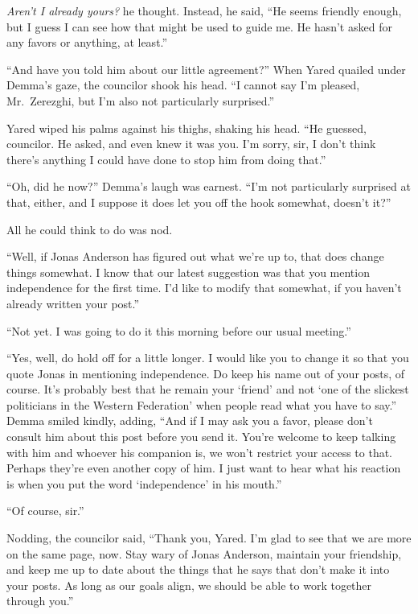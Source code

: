 \emph{Aren't I already yours?} he thought. Instead, he said, ``He seems friendly enough, but I guess I can see how that might be used to guide me. He hasn't asked for any favors or anything, at least.''

``And have you told him about our little agreement?'' When Yared quailed under Demma's gaze, the councilor shook his head. ``I cannot say I'm pleased, Mr.~Zerezghi, but I'm also not particularly surprised.''

Yared wiped his palms against his thighs, shaking his head. ``He guessed, councilor. He asked, and even knew it was you. I'm sorry, sir, I don't think there's anything I could have done to stop him from doing that.''

``Oh, did he now?'' Demma's laugh was earnest. ``I'm not particularly surprised at that, either, and I suppose it does let you off the hook somewhat, doesn't it?''

All he could think to do was nod.

``Well, if Jonas Anderson has figured out what we're up to, that does change things somewhat. I know that our latest suggestion was that you mention independence for the first time. I'd like to modify that somewhat, if you haven't already written your post.''

``Not yet. I was going to do it this morning before our usual meeting.''

``Yes, well, do hold off for a little longer. I would like you to change it so that you quote Jonas in mentioning independence. Do keep his name out of your posts, of course. It's probably best that he remain your `friend' and not `one of the slickest politicians in the Western Federation' when people read what you have to say.'' Demma smiled kindly, adding, ``And if I may ask you a favor, please don't consult him about this post before you send it. You're welcome to keep talking with him and whoever his companion is, we won't restrict your access to that. Perhaps they're even another copy of him. I just want to hear what his reaction is when you put the word `independence' in his mouth.''

``Of course, sir.''

Nodding, the councilor said, ``Thank you, Yared. I'm glad to see that we are more on the same page, now. Stay wary of Jonas Anderson, maintain your friendship, and keep me up to date about the things that he says that don't make it into your posts. As long as our goals align, we should be able to work together through you.''

